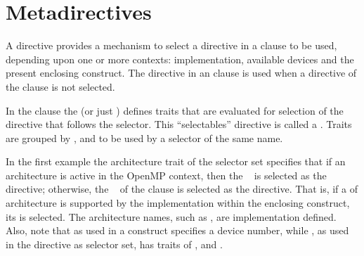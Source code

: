 \pagebreak
\section{Metadirectives}
\label{sec:metadirective}

A  directive provides a mechanism to select a directive in
a  clause to be used, depending upon one or more contexts:  
implementation, available devices and the present enclosing construct. 
The directive in an  clause is used when a directive of the 
 clause is not selected.

In the  clause the  (or just ) defines traits that are
evaluated for selection of the directive that follows the selector. 
This ``selectables'' directive is called a .
Traits are grouped by ,  and 
  to be used by a selector of the same name.

In the first example the architecture trait  of the 
 selector set specifies that if an  architecture is
active in the OpenMP context, then the ~ 
 is selected as the directive; otherwise, the ~
 of the  clause is selected as the directive.
That is, if a  of  architecture is supported by the implementation within
the enclosing  construct, its  is selected.
The architecture names, such as , are implementation defined.
Also, note that  as used in a  construct specifies
a device number, while , as used in the 
directive as selector set, has traits of ,  and .



